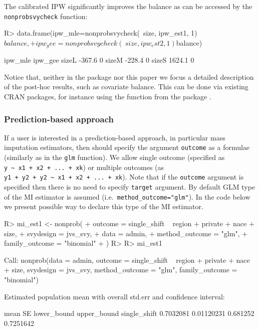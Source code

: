 \documentclass[
]{jss}
\begin{document}
The calibrated IPW significantly improves the balance as can be accessed
by the \texttt{nonprobsvycheck} function:

\begin{CodeChunk}
\begin{CodeInput}
R> data.frame(ipw_mle=nonprobsvycheck(~size, ipw_est1, 1)$balance,
+            ipw_gee=nonprobsvycheck(~size, ipw_est2, 1)$balance)
\end{CodeInput}
\begin{CodeOutput}
      ipw_mle ipw_gee
sizeL  -367.6       0
sizeM  -228.4       0
sizeS  1624.1       0
\end{CodeOutput}
\end{CodeChunk}

Notice that, neither in the package nor this paper we focus a detailed
description of the post-hoc results, such as covariate balance. This can
be done via existing CRAN packages, for instance using the
 function from the  package \citep{cobalt}.

\subsubsection{Prediction-based
approach}\label{prediction-based-approach}

If a user is interested in a prediction-based approach, in particular
mass imputation estimators, then should specify the argument
\texttt{outcome} as a formulae (similarly as in the \texttt{glm}
function). We allow single outcome (specified as
\texttt{y\ \textasciitilde{}\ x1\ +\ x2\ +\ ...\ +\ xk}) or multiple
outcomes (as
\texttt{y1\ +\ y2\ +\ y2\ \textasciitilde{}\ x1\ +\ x2\ +\ ...\ +\ xk}).
Note that if the \texttt{outcome} argument is specified then there is no
need to specify \texttt{target} argument. By default GLM type of the MI
estimator is assumed (i.e.~\texttt{method\_outcome="glm"}). In the code
below we present possible way to declare this type of the MI estimator.

\begin{CodeChunk}
\begin{CodeInput}
R> mi_est1 <- nonprob(
+   outcome = single_shift ~ region + private + nace + size,
+   svydesign = jvs_svy,
+   data = admin,
+   method_outcome = "glm",
+   family_outcome = "binomial"
+ )
R> 
R> mi_est1
\end{CodeInput}
\begin{CodeOutput}

Call:
nonprob(data = admin, outcome = single_shift ~ region + private + 
    nace + size, svydesign = jvs_svy, method_outcome = "glm", 
    family_outcome = "binomial")

Estimated population mean with overall std.err and confidence interval:

                  mean         SE lower_bound upper_bound
single_shift 0.7032081 0.01120231    0.681252   0.7251642
\end{CodeOutput}
\end{CodeChunk}
\end{document}
